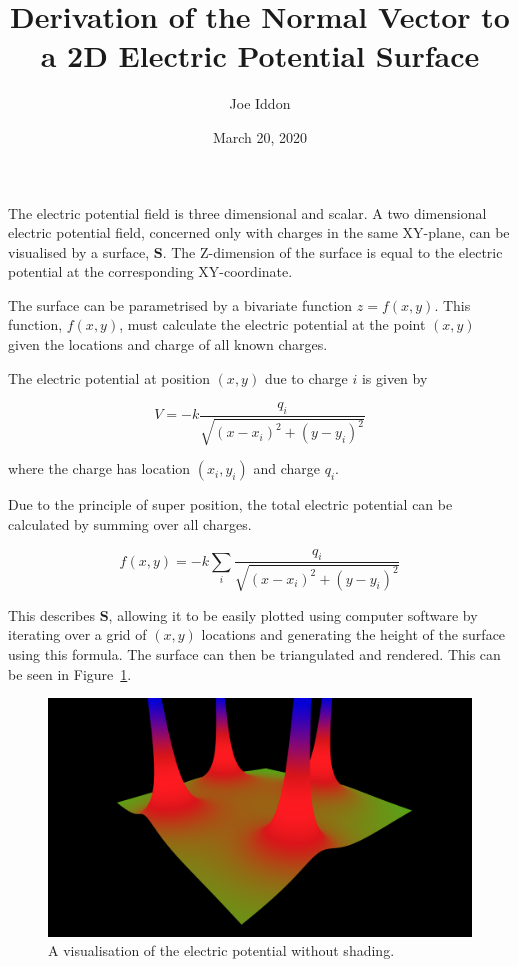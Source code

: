 \documentclass{article} %
\begin{document}
\title{Derivation of the Normal Vector to a 2D Electric Potential Surface}
\author{Joe Iddon}
\date{March 20, 2020}
\maketitle

The electric potential field is three dimensional and scalar. A two dimensional electric potential field, concerned only with charges in the same XY-plane, can be visualised by a surface, $\textbf{S}$. The Z-dimension of the surface is equal to the electric potential at the corresponding XY-coordinate.


The surface can be parametrised by a bivariate function $z = f(x,y)$. This function, $f(x,y)$, must calculate the electric potential at the point $(x,y)$ given the locations and charge of all known charges.

The electric potential at position $(x,y)$ due to charge $i$ is given by

$$V = -k\frac{q_i}{\sqrt{(x-x_i)^2 + (y-y_i)^2}}$$

where the charge has location $(x_i, y_i)$ and charge $q_i$.

Due to the principle of super position, the total electric potential can be calculated by summing over all charges.

$$f(x,y) = -k\sum_{i}\frac{q_i}{\sqrt{(x-x_i)^2 + (y-y_i)^2}}$$

This describes $\textbf{S}$, allowing it to be easily plotted using computer software by iterating over a grid of $(x,y)$ locations and generating the height of the surface using this formula. The surface can then be triangulated and rendered. This can be seen in Figure~\ref{fig:no-shading}.

\begin{figure}
\includegraphics[width=\linewidth]{no_shading.png}
\caption{A visualisation of the electric potential without shading.}
\label{fig:no-shading}
\end{figure}
\end{document}
